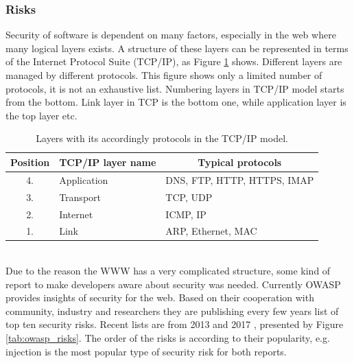 \documentclass{article} %
\begin{document}
\subsubsection{Risks}
Security of software is dependent on many factors, especially in the web where many logical layers exists. A structure of these layers can be represented in terms of the Internet Protocol Suite (TCP/IP), as Figure \ref{tab:tcp_layers_protocols} shows. Different layers are managed by different protocols. This figure shows only a limited number of protocols, it is not an exhaustive list. Numbering layers in TCP/IP model starts from the bottom. Link layer in TCP is the bottom one, while application layer is the top layer etc.
\begin{table}[ht]
\centering
    \begin{tabular}{ | c | l | l |}
    \hline
    \multicolumn{1}{|c|}{\textbf{Position}} & \multicolumn{1}{c|}{\textbf{TCP/IP\index{Internet Protocol Suite (TCP/IP)} layer name}} & \multicolumn{1}{c|}{\textbf{Typical protocols}} \\ \hline
    4. & Application & DNS\index{Domain Name System (DNS)}, FTP\index{File Transfer Protocol (FTP)}, HTTP\index{Hypertext Transfer Protocol (HTTP)}, HTTPS\index{Hypertext Transfer Protocol Secure (HTTPS)}, IMAP\index{Internet Message Access Protocol (IMAP)} \\ \hline
    3. & Transport & TCP\index{Transmission Control Protocol (TCP)}, UDP\index{User Datagram Protocol (UDP)} \\ \hline
    2. & Internet & ICMP\index{Internet Control Message Protocol (ICMP)}, IP\index{Internet Protocol (IP)} \\ \hline
    1. & Link & ARP\index{Address Resolution Protocol (ARP)}, Ethernet\index{Ethernet}, MAC\index{Medium Access Control (MAC)} \\ \hline
    \end{tabular}
\caption{Layers with its accordingly protocols in the TCP/IP model.}
\label{tab:tcp_layers_protocols}
\end{table}\\
Due to the reason the WWW has a very complicated structure, some kind of report to make developers aware about security was needed. Currently OWASP provides insights of security for the web. Based on their cooperation with community, industry and researchers they are publishing every few years list of top ten security risks. Recent lists are from 2013 \cite{bib:owasp_2013} and 2017 \cite{bib:owasp_2017}, presented by Figure \ref{tab:owasp_risks}. The order of the risks is according to their popularity, e.g. injection is the most popular type of security risk for both reports.
\end{document}
